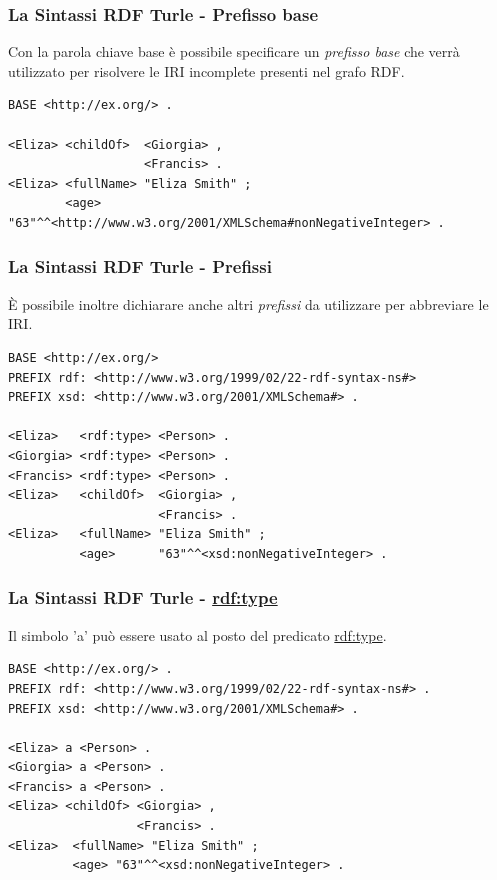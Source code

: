 \documentclass[8pt]{beamer}
\begin{document}
% 
% 
% 

\begin{frame}[fragile]
 \frametitle{La Sintassi RDF Turle - Prefisso base}

Con la parola chiave base \`e possibile specificare un \emph{prefisso base}
che verr\`a utilizzato per risolvere le IRI incomplete presenti nel grafo RDF.

\begin{Verbatim}[fontsize=\small]
BASE <http://ex.org/> .

<Eliza> <childOf>  <Giorgia> ,
                   <Francis> .
<Eliza> <fullName> "Eliza Smith" ;
        <age> "63"^^<http://www.w3.org/2001/XMLSchema#nonNegativeInteger> .
\end{Verbatim}
\end{frame}

\begin{frame}[fragile]
 \frametitle{La Sintassi RDF Turle - Prefissi}

\`E possibile inoltre dichiarare anche altri \emph{prefissi} da utilizzare
per abbreviare le IRI.

\begin{Verbatim}[fontsize=\small]
BASE <http://ex.org/>
PREFIX rdf: <http://www.w3.org/1999/02/22-rdf-syntax-ns#>
PREFIX xsd: <http://www.w3.org/2001/XMLSchema#> .

<Eliza>   <rdf:type> <Person> .
<Giorgia> <rdf:type> <Person> .
<Francis> <rdf:type> <Person> .
<Eliza>   <childOf>  <Giorgia> ,
                     <Francis> . 
<Eliza>   <fullName> "Eliza Smith" ;
          <age>      "63"^^<xsd:nonNegativeInteger> .
\end{Verbatim}
\end{frame}

\begin{frame}[fragile]
 \frametitle{La Sintassi RDF Turle - \url{rdf:type}}

Il simbolo 'a' pu\`o essere usato al posto del predicato \url{rdf:type}.

\begin{Verbatim}[fontsize=\small]
BASE <http://ex.org/> .
PREFIX rdf: <http://www.w3.org/1999/02/22-rdf-syntax-ns#> .
PREFIX xsd: <http://www.w3.org/2001/XMLSchema#> .

<Eliza> a <Person> .
<Giorgia> a <Person> .
<Francis> a <Person> .
<Eliza> <childOf> <Giorgia> ,
                  <Francis> .
<Eliza>  <fullName> "Eliza Smith" ;
         <age> "63"^^<xsd:nonNegativeInteger> .
\end{Verbatim}
\end{frame}
\end{document}
